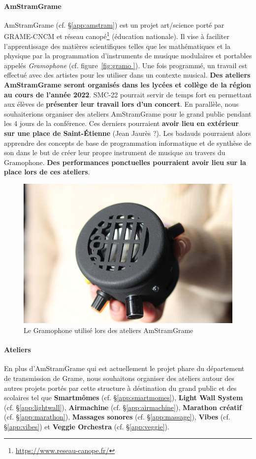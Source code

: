 \documentclass[fontsize=12pt]{scrartcl} %
\numberwithin{equation}{section} %
\numberwithin{table}{section} %
\begin{document}
\paragraph{\textbf{AmStramGrame}} AmStramGrame (cf. \S\ref{app:amstram}) est un projet art/science porté par GRAME-CNCM et réseau canopé\footnote{\url{https://www.reseau-canope.fr/}} (éducation nationale). Il vise à faciliter l'apprentissage des matières scientifiques telles que les mathématiques et la physique par la programmation d'instruments de musique modulaires et portables appelés \textit{Gramophone} (cf. figure~\ref{fig:gramo }). Une fois programmé, un travail est effectué avec des artistes pour les utiliser dans un contexte musical. \textbf{Des ateliers AmStramGrame seront organisés dans les lycées et collège de la région au cours de l'année 2022}. SMC-22 pourrait servir de temps fort en permettant aux élèves de \textbf{présenter leur travail lors d'un concert}. En parallèle, nous souhaiterions organiser des ateliers AmStramGrame pour le grand public pendant les 4 jours de la conférence. Ces derniers pourraient \textbf{avoir lieu en extérieur sur une place de Saint-Étienne} (Jean Jaurès ?). Les badauds pourraient alors apprendre des concepts de base de programmation informatique et de synthèse de son dans le but de créer leur propre instrument de musique au travers du Gramophone. \textbf{Des performances ponctuelles pourraient avoir lieu sur la place lors de ces ateliers}.  

\begin{figure}[h]
  \centering
  \includegraphics[width=12cm]{img/gramo}
  \caption{Le Gramophone utilisé lors des ateliers AmStramGrame}
  \label{fig:gramo}
\end{figure}

\paragraph{\textbf{Ateliers}} En plus d'AmStramGrame qui est actuellement le projet phare du département de transmission de Grame, nous souhaitons organiser des ateliers autour des autres projets portés par cette structure à déstination du grand public et des scolaires tel que \textbf{Smartmômes} (cf. \S\ref{app:smartmomes}), \textbf{Light Wall System} (cf. \S\ref{app:lightwall}), \textbf{Airmachine} (cf. \S\ref{app:airmachine}), \textbf{Marathon créatif} (cf. \S\ref{app:marathon}), \textbf{Massages sonores} (cf. 
\S\ref{app:massage}), \textbf{Vibes} (cf. \S\ref{app:vibes}) et \textbf{Veggie Orchestra} (cf. \S\ref{app:veggie}).
\end{document}
